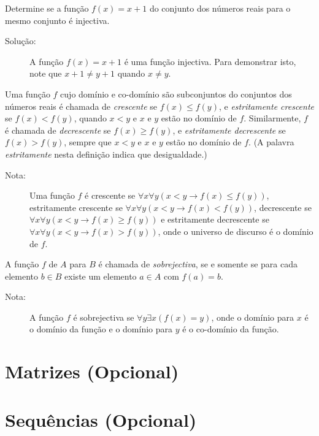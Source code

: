 \begin{exmp}
\label{exem331}
Determine se a função $f(x)=x+1$ do conjunto dos números reais para o mesmo
conjunto é injectiva.
\begin{description}
\item[Solução:]A função $f(x)=x+1$ é uma função injectiva. Para demonstrar isto,
note que $x+1 \neq y+1$ quando $x \neq y$.
\end{description}
\end{exmp}

\begin{defn}
\label{def321}
Uma função $f$ cujo domínio e co-domínio são subconjuntos do conjuntos dos
números reais é chamada de \emph{crescente} se $f(x) \leq f(y)$, e
\emph{estritamente crescente} se $f(x) < f(y)$, quando $x<y$ e $x$ e $y$ estão
no domínio de $f$.
Similarmente, $f$ é chamada de \emph{decrescente} se $f(x) \geq f(y)$, e
\emph{estritamente decrescente} se $f(x) > f(y)$, sempre que $x<y$ e $x$ e $y$
estão no domínio de $f$. (A palavra \emph{estritamente} nesta definição indica
que desigualdade.)
\end{defn}

\begin{description}
\item[Nota:]Uma função $f$ é crescente se $\forall x\forall y(x<y \to f(x) \leq
f(y))$, estritamente crescente se $\forall x\forall y(x<y \to f(x) < f(y))$,
decrescente se $\forall x\forall y(x<y \to f(x) \geq f(y))$ e estritamente
decrescente se $\forall x\forall y(x<y \to f(x) > f(y))$, onde o universo de
discurso é o domínio de $f$.
\end{description}

\begin{defn}
\label{def322}
A função $f$ de $A$ para $B$ é chamada de \emph{sobrejectiva}, se e somente se
para cada elemento $b \in B$ existe um elemento $a \in A$ com $f(a)=b$.

\begin{description}
\item[Nota:]A função $f$ é sobrejectiva se $\forall y\exists x(f(x)=y)$, onde o
domínio para $x$ é o domínio da função e o domínio para $y$ é o co-domínio da
função.
\end{description}
\end{defn}

\section{Matrizes (Opcional)}
\section{Sequências (Opcional)}
